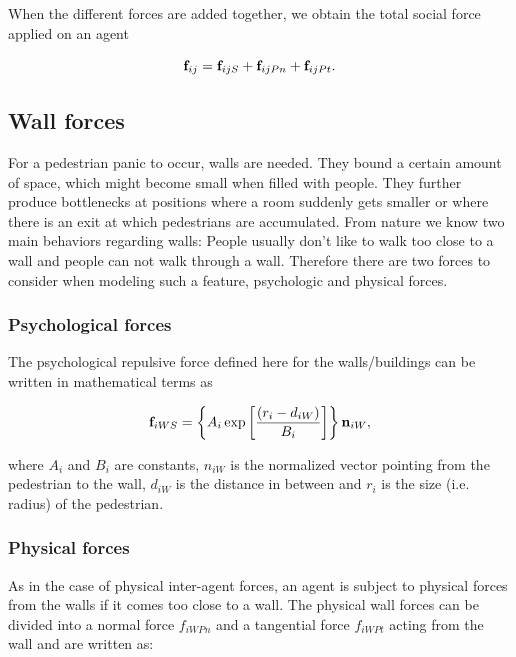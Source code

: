 \documentclass[11pt]{article}
\begin{document}
When the different forces are added together, we obtain the total social force applied on an agent

\begin{equation}
	{{\bf f}_{ij}} = {{\bf f}_{ijS}} + {{\bf f}_{ijPn}} + {{\bf f}_{ijPt}} .
		\label{eq:fij}
\end{equation}

\subsection{Wall forces}

For a pedestrian panic to occur, walls are needed. They bound a certain amount of space, which might become small when filled with people. They further produce bottlenecks at positions where a room suddenly gets smaller or where there is an exit at which pedestrians are accumulated. From nature we know two main behaviors regarding walls: People usually don't like to walk too close to a wall and people can not walk through a wall. Therefore there are two forces to consider when modeling such a feature, psychologic and physical forces.

\subsubsection{Psychological forces}

The psychological repulsive force defined here for the walls/buildings can be written in mathematical terms as

\begin{equation}
	{{\bf f}_{iWS}} = \left\{ {{A_i}\exp \left[ {\frac{{\left( {{r_i} - {d_{iW}}} \right)}}{{{B_i}}}} \right]} \right\}{{\bf n}_{iW}} ,
	\label{eq:fiWS}
\end{equation}

where $A_i$ and $B_i$ are constants, $n_{iW}$ is the normalized vector pointing from the pedestrian to the wall, $d_{iW}$ is the distance in between and $r_i$ is the size (i.e. radius) of the pedestrian.

\subsubsection{Physical forces}
As in the case of physical inter-agent forces, an agent is subject to physical forces from the walls if it comes too close to a wall. The physical wall forces can be divided into a normal force $f_{iWPn}$ and a tangential force $f_{iWPt}$ acting from the wall and are written as:
\end{document}
